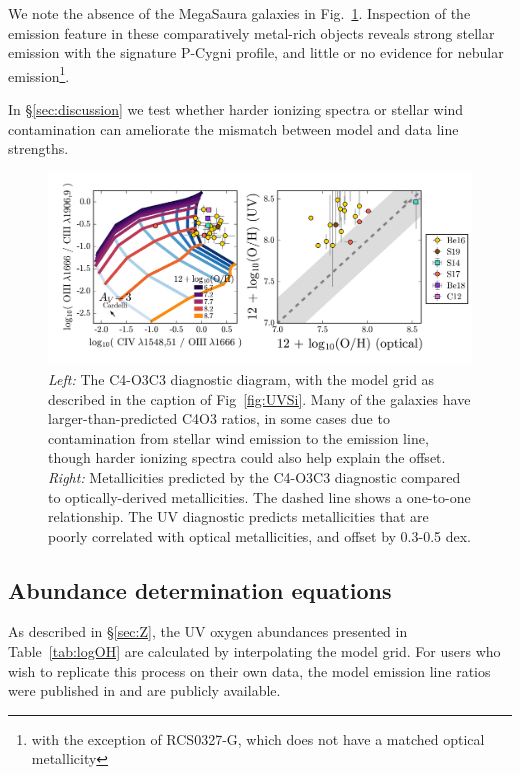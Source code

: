 \documentclass[trackchanges, preprint2]{aastex62}
\newcommand{\civ}{\ion{C}{4}}
\newcommand{\mage}{{\sc Meg}a{\sc S}a{\sc ura}\xspace}
\begin{document}
We note the absence of the \mage galaxies in Fig.~\ref{fig:UVCIV}. Inspection of the  emission feature in these comparatively metal-rich objects reveals strong stellar emission with the signature P-Cygni profile, and little or no evidence for nebular emission\footnote{with the exception of RCS0327-G, which does not have a matched optical metallicity}\citep{Chisholm+2019}.

In \S\ref{sec:discussion} we test whether harder ionizing spectra or stellar wind contamination can ameliorate the mismatch between model and data  line strengths.

\begin{figure}
  \begin{center}
    \includegraphics[width=\linewidth]{figs/f5.png}
    \caption{\emph{Left:} The C4-O3C3 diagnostic diagram, with the model grid as described in the caption of Fig~\ref{fig:UVSi}. Many of the galaxies have larger-than-predicted C4O3 ratios, in some cases due to contamination from stellar wind emission to the \civ{} emission line, though harder ionizing spectra could also help explain the offset. \emph{Right:} Metallicities predicted by the C4-O3C3 diagnostic compared to optically-derived metallicities. The dashed line shows a one-to-one relationship. The UV diagnostic predicts metallicities that are poorly correlated with optical metallicities, and offset by 0.3-0.5 dex.}
    \label{fig:UVCIV}
  \end{center}
\end{figure}
\subsection{Abundance determination equations}\label{sec:ZZ:poly}
As described in \S\ref{sec:Z}, the UV oxygen abundances presented in Table~\ref{tab:logOH} are calculated by interpolating the model grid. For users who wish to replicate this process on their own data, the model emission line ratios were published in  and are publicly available.
\end{document}
